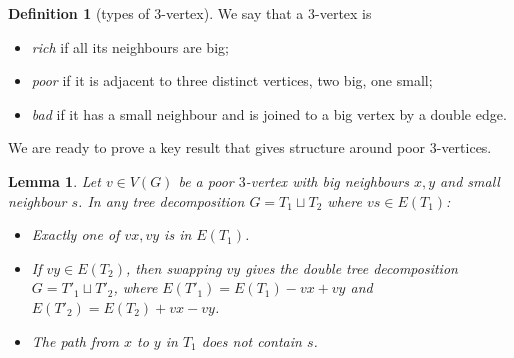 \documentclass[11pt, reqno, a4paper]{article}
\newtheorem{lemma}{Lemma}[section]
\theoremstyle{definition}
\newtheorem{definition}{Definition}
\numberwithin{equation}{section}
\begin{document}
\begin{definition}[types of \(3\)-vertex]
We say that a $3$-vertex is
\begin{itemize}[noitemsep, topsep=0pt]
\item \emph{rich} if all its neighbours are big;
\item \emph{poor} if it is adjacent to three distinct vertices, two big, one small;
\item \emph{bad} if it has a small neighbour and is joined to a big vertex by a double edge.
\end{itemize}
\end{definition}
We are ready to prove a key result that gives structure around poor \(3\)-vertices.

\begin{lemma}\label{fact:poor3}
Let $v\in V(G)$ be a poor $3$-vertex with big neighbours $x,y$ and small neighbour $s$.
In any tree decomposition $G=T_1\sqcup T_2$ where \(vs \in E(T_1)\)\textnormal{:}
\begin{itemize}[noitemsep]
    \item Exactly one of \(vx, vy\) is in \(E(T_1)\).
    \item If \(vy \in E(T_2)\), then swapping \(vy\) gives the double tree decomposition \(G = T'_1 \sqcup T'_2\), where \(E(T'_1) = E(T_1) - vx + vy\) and \(E(T'_2) = E(T_2) + vx - vy\).
    \item The path from \(x\) to \(y\) in \(T_1\) does not contain \(s\).
\end{itemize}
\end{lemma}
\end{document}
